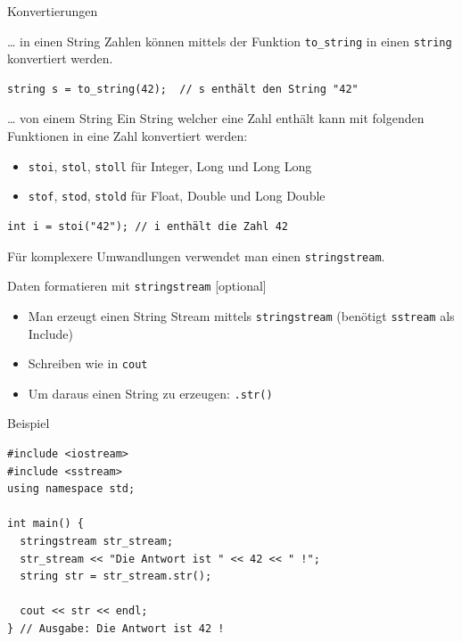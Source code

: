 \documentclass[presentation]{beamer}
\begin{document}
\begin{frame}[label={sec:org54cfb21},fragile]{Konvertierungen}
 \begin{block}{\ldots{} in einen String}
Zahlen können mittels der Funktion {\color{solarizedYellow}\verb!to_string!} in einen {\color{solarizedYellow}\verb!string!}
konvertiert werden.
\begin{verbatim}
string s = to_string(42);  // s enthält den String "42"
\end{verbatim}
\end{block}
\begin{block}{\ldots{} von einem String}
Ein String welcher eine Zahl enthält kann mit folgenden Funktionen in
eine Zahl konvertiert werden:
\begin{itemize}
\item {\color{solarizedYellow}\verb!stoi!}, {\color{solarizedYellow}\verb!stol!}, {\color{solarizedYellow}\verb!stoll!} für Integer, Long und Long Long
\item {\color{solarizedYellow}\verb!stof!}, {\color{solarizedYellow}\verb!stod!}, {\color{solarizedYellow}\verb!stold!} für Float, Double und Long Double
\end{itemize}
\begin{verbatim}
int i = stoi("42"); // i enthält die Zahl 42
\end{verbatim}
\end{block}
Für komplexere Umwandlungen verwendet man einen {\color{solarizedYellow}\verb!stringstream!}.
\end{frame}
\begin{frame}[label={sec:org2eb3d10},fragile]{Daten formatieren mit {\color{solarizedYellow}\texttt{stringstream}} [optional]}
 \begin{itemize}
\item Man erzeugt einen \alert{String Stream} mittels {\color{solarizedYellow}\verb!stringstream!} (benötigt
{\color{solarizedYellow}\verb!sstream!} als Include)
\item Schreiben wie in {\color{solarizedYellow}\verb!cout!}
\item Um daraus einen String zu erzeugen: {\color{solarizedYellow}\verb!.str()!}
\end{itemize}
\begin{exampleblock}{Beispiel}
\begin{verbatim}
#include <iostream>
#include <sstream>
using namespace std;

int main() {
  stringstream str_stream;
  str_stream << "Die Antwort ist " << 42 << " !";
  string str = str_stream.str();

  cout << str << endl;
} // Ausgabe: Die Antwort ist 42 !
\end{verbatim}
\end{exampleblock}
\end{frame}
\end{document}
